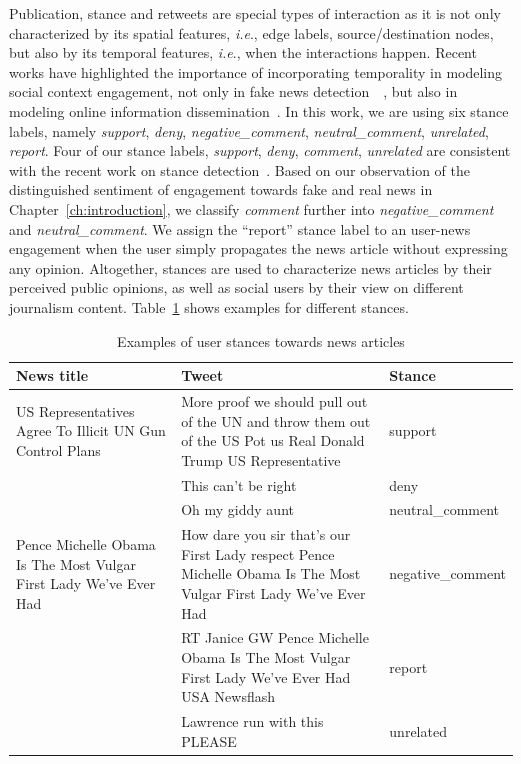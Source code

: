 \documentclass[fyp]{socreport}
\theoremstyle{definition}
\theoremstyle{hypothesis}
\begin{document}
Publication, stance and retweets are special types of interaction as it is not only characterized by its spatial features, \textit{i.e}., edge labels, source/destination nodes, but also by its temporal features, \textit{i.e}., when the interactions happen. Recent works have highlighted the importance of incorporating temporality in modeling social context engagement, not only in fake news detection~\cite{ruchansky2017csi}~\cite{ma2015detect}, but also in modeling online information dissemination~\cite{he2014predicting}. In this work, we are using six  stance labels, namely \textit{support}, \textit{deny}, \textit{negative\_comment}, \textit{neutral\_comment}, \textit{unrelated}, \textit{report}. Four of our stance labels, \textit{support}, \textit{deny}, \textit{comment}, \textit{unrelated} are consistent with the recent work on stance detection~\cite{mohtarami2018automatic}. Based on our observation of the distinguished sentiment of engagement towards fake and real news in Chapter~\ref{ch:introduction}, we classify \textit{comment} further into \textit{negative\_comment} and \textit{neutral\_comment}. We assign the ``report'' stance label to an user-news engagement when the user simply propagates the news article without expressing any opinion. Altogether, stances are used to characterize news articles by their perceived public opinions, as well as social users by their view on different journalism content. Table~\ref{table:stance_examples} shows examples for different stances.

\begin{table}[t]
  \centering
  \tiny
  \begin{tabular}{|p{4cm}|p{7cm}|p{2cm}|}
  \hline
    News title & Tweet & Stance \\ \hline \hline
  US Representatives Agree To Illicit UN Gun Control Plans & More proof we should pull out of the UN and throw them out of the US Pot us Real Donald Trump US Representative & support \\ \cline{2-3}
  & This can't be right & deny \\ \cline{2-3}
  & Oh my giddy aunt & neutral\_comment \\ \hline
  Pence Michelle Obama Is The Most Vulgar First Lady We've Ever Had & How dare you sir that's our First Lady respect Pence Michelle Obama Is The Most Vulgar First Lady We've Ever Had & negative\_comment \\ \cline{2-3}
  & RT Janice GW Pence Michelle Obama Is The Most Vulgar First Lady We've Ever Had USA Newsflash & report \\ \cline{2-3}
  & Lawrence run with this PLEASE & unrelated \\ \hline
  \end{tabular}
  \caption{Examples of user stances towards news articles}
  \label{table:stance_examples}
\end{table}
\end{document}
